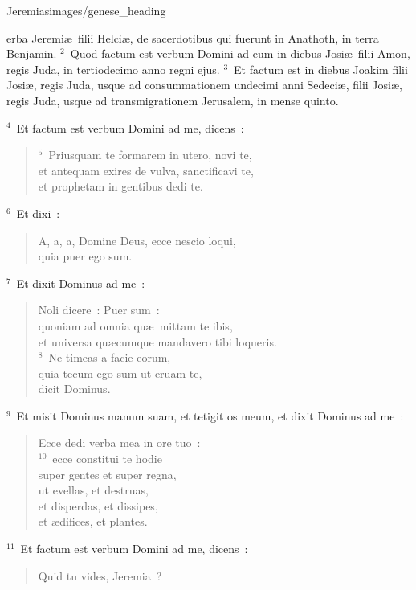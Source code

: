 {Jeremias}{images/genese_heading}


\bchapter
{}erba Jeremi\ae\ filii Helci\ae , de sacerdotibus qui fuerunt in Anathoth, in terra Benjamin.
${}^{2}$~Quod factum est verbum Domini ad eum in diebus Josi\ae\ filii Amon, regis Juda, in tertiodecimo anno regni ejus.
${}^{3}$~Et factum est in diebus Joakim filii Josi\ae , regis Juda, usque ad consummationem undecimi anni Sedeci\ae , filii Josi\ae , regis Juda, usque ad transmigrationem Jerusalem, in mense quinto.


${}^{4}$~Et factum est verbum Domini ad me, dicens~:
\begin{verse}${}^{5}$~Priusquam te formarem in utero, novi te,\\ et antequam exires de vulva, sanctificavi te,\\ et prophetam in gentibus dedi te.\end{verse}


${}^{6}$~Et dixi~: \begin{verse}A, a, a, Domine Deus, ecce nescio loqui,\\ quia puer ego sum.\end{verse}


${}^{7}$~Et dixit Dominus ad me~: \begin{verse}Noli dicere~: Puer sum~:\\ quoniam ad omnia qu\ae\ mittam te ibis,\\ et universa qu\ae cumque mandavero tibi loqueris.\\
${}^{8}$~Ne timeas a facie eorum,\\ quia tecum ego sum ut eruam te,\\ dicit Dominus.\end{verse}


${}^{9}$~Et misit Dominus manum suam, et tetigit os meum, et dixit Dominus ad me~: \begin{verse}Ecce dedi verba mea in ore tuo~:\\
${}^{10}$~ecce constitui te hodie\\ super gentes et super regna,\\ ut evellas, et destruas,\\ et disperdas, et dissipes,\\ et \ae difices, et plantes.\end{verse}


${}^{11}$~Et factum est verbum Domini ad me, dicens~: \begin{verse}Quid tu vides, Jeremia~?\end{verse}

